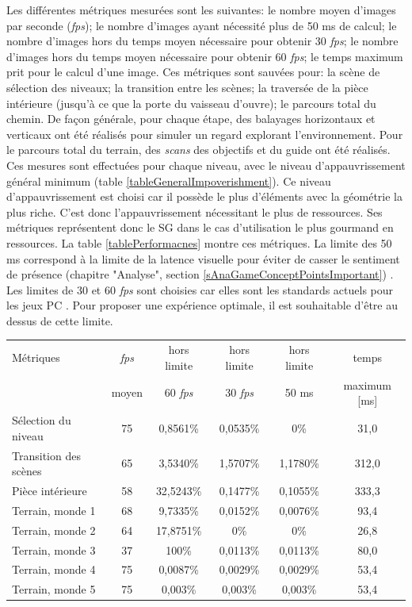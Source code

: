 	Les différentes métriques mesurées sont les suivantes: le nombre moyen d'images par seconde (\textit{fps}); le nombre d'images ayant nécessité plus de 50 ms de calcul; le nombre d'images hors du temps moyen nécessaire pour obtenir 30 \textit{fps}; le nombre d'images hors du temps moyen nécessaire pour obtenir 60 \textit{fps}; le temps maximum prit pour le calcul d'une image. Ces métriques sont sauvées pour: la scène de sélection des niveaux; la transition entre les scènes; la traversée de la pièce intérieure (jusqu'à ce que la porte du vaisseau d'ouvre); le parcours total du chemin. De façon générale, pour chaque étape, des balayages horizontaux et verticaux ont été réalisés pour simuler un regard explorant l'environnement. Pour le parcours total du terrain, des \textit{scans} des objectifs et du guide ont été réalisés. Ces mesures sont effectuées pour chaque niveau, avec le niveau d'appauvrissement général minimum (table \ref{tableGeneralImpoverishment}). Ce niveau d'appauvrissement est choisi car il possède le plus d'éléments avec la géométrie la plus riche. C'est donc l'appauvrissement nécessitant le plus de ressources. Ses métriques représentent donc le SG dans le cas d'utilisation le plus gourmand en ressources. La table \ref{tablePerformacnes} montre ces métriques. La limite des 50 ms correspond à la limite de la latence visuelle pour éviter de casser le sentiment de présence (chapitre "Analyse", section \ref{sAnaGameConceptPointsImportant}) \cite{Jay_RT_ModelingEffectsDelayedHaptic}. Les limites de 30 et 60 \textit{fps} sont choisies car elles sont les standards actuels pour les jeux PC \cite{PoweringTheRift}. Pour proposer une expérience optimale, il est souhaitable d'être au dessus de cette limite.\medskip
	
	\begin{minipage}{\linewidth}
		\begin{tabular}{|l|c|c|c|c|c|}
			\hline
			Métriques&	\textit{fps}& hors limite& hors limite& hors limite& temps\\
			& moyen& 60 \textit{fps}& 30 \textit{fps}& 50 ms& maximum [ms]\\
			\hline
			Sélection du niveau& 75& 0,8561\%& 0,0535\%& 0\%& 31,0\\
			\hline			
			Transition des scènes& 65& 3,5340\%& 1,5707\%& 1,1780\%& 312,0\\
			\hline
			Pièce intérieure& 58& 32,5243\%& 0,1477\%& 0,1055\%& 333,3\\
			\hline
			Terrain, monde 1& 68& 9,7335\%& 0,0152\%& 0,0076\%& 93,4\\
			\hline
			Terrain, monde 2& 64& 17,8751\%& 0\%& 0\%& 26,8\\
			\hline
			Terrain, monde 3& 37& 100\%& 0,0113\%& 0,0113\%& 80,0\\
			\hline
			Terrain, monde 4& 75& 0,0087\%& 0,0029\%& 0,0029\%& 53,4\\
			\hline
			Terrain, monde 5& 75& 0,003\%& 0,003\%& 0,003\%& 53,4	\\	
			\hline
		\end{tabular}
		\label{tablePerformacnes}
	\end{minipage}\medskip
	
